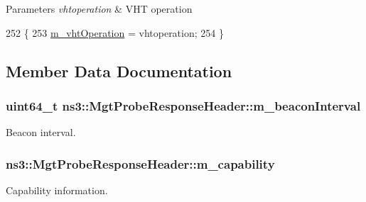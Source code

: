 \begin{DoxyParams}{Parameters}
{\em vhtoperation} & V\+HT operation \\
\hline
\end{DoxyParams}

\begin{DoxyCode}
252 \{
253   \hyperlink{classns3_1_1MgtProbeResponseHeader_a02d6b449ac57db6ce584a6a969258fde}{m\_vhtOperation} = vhtoperation;
254 \}
\end{DoxyCode}


\subsection{Member Data Documentation}
\subsubsection[{\texorpdfstring{m\+\_\+beacon\+Interval}{m_beaconInterval}}]{\setlength{\rightskip}{0pt plus 5cm}uint64\+\_\+t ns3\+::\+Mgt\+Probe\+Response\+Header\+::m\+\_\+beacon\+Interval\hspace{0.3cm}{\ttfamily [private]}}\hypertarget{classns3_1_1MgtProbeResponseHeader_a1108654897bdae0b2de2380319662246}{}\label{classns3_1_1MgtProbeResponseHeader_a1108654897bdae0b2de2380319662246}


Beacon interval. 

\subsubsection[{\texorpdfstring{m\+\_\+capability}{m_capability}}]{ ns3\+::\+Mgt\+Probe\+Response\+Header\+::m\+\_\+capability\hspace{0.3cm}{\ttfamily [private]}}\hypertarget{classns3_1_1MgtProbeResponseHeader_ae3da012e14970d6cab1e7066e023a0cd}{}\label{classns3_1_1MgtProbeResponseHeader_ae3da012e14970d6cab1e7066e023a0cd}


Capability information. 

